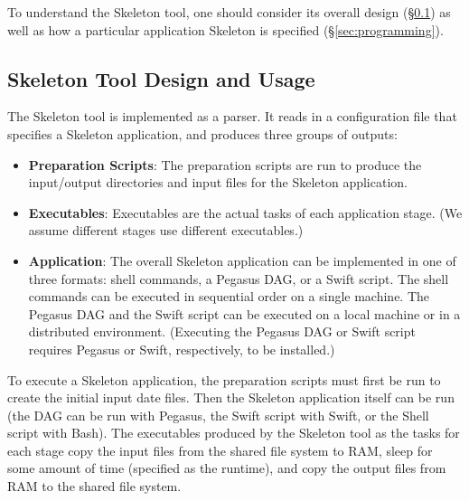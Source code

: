 \documentclass{sig-alternate}
\newcommand{\katznote}[1]{ {\textcolor{blue}    { ***Dan:      #1 }}}
\newcommand{\zhaonote}[1]{{\textcolor{darkgreen}    { ***Zhao:      #1 }}}
\newcommand{\katznote}[1]{}
\newcommand{\zhaonote}[1]{}
\begin{document}
To understand the Skeleton tool, one should consider its overall design (\S\ref{sec:design}) as well as how a particular application Skeleton is specified (\S\ref{sec:programming}).

\subsection{Skeleton Tool Design and Usage} \label{sec:design}

The Skeleton tool is implemented as a parser. It reads in a configuration file that specifies a Skeleton application, and produces three groups of outputs:
\begin{itemize}

\item[] \textbf{Preparation Scripts}: The preparation scripts are run to produce the input/output directories and input files for the Skeleton application.

\item[] \textbf{Executables}: Executables are the actual tasks of each application stage. (We assume different stages use different executables.)

\item[] \textbf{Application}: The overall Skeleton application can be implemented in one of three  formats:
shell commands, a Pegasus DAG, or a Swift script.
The shell commands can be executed in sequential order on a single machine.
The Pegasus DAG and the Swift script can be executed on a local machine or in a distributed environment.
(Executing the Pegasus DAG or Swift script requires Pegasus or Swift, respectively, to be installed.)

\end{itemize}

To execute a Skeleton application, the preparation scripts must first be run to create the initial input date files. Then the Skeleton application itself can be run (the DAG can be run with Pegasus, the Swift script with Swift, or the Shell script with Bash). The executables produced by the Skeleton tool as the tasks for each stage copy the input files from the shared file system to RAM, sleep for some amount of time (specified as the runtime), and copy the output files from RAM to the shared file system. 

\end{document}

